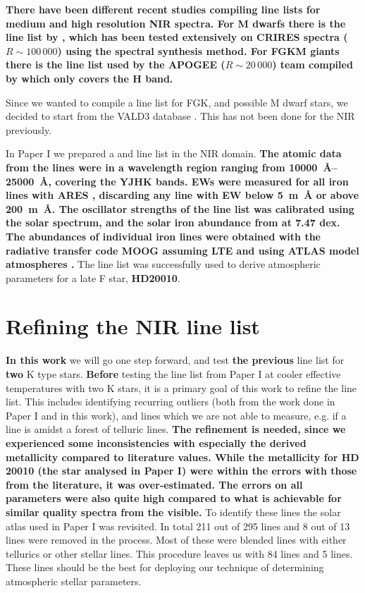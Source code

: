 \documentclass{aa}
\begin{document}
{\bf There have been different recent studies compiling line lists for medium
and high resolution NIR spectra. For M dwarfs there is the line list by
\citet{Onehag2012,Lindgren2016}, which has been tested extensively on CRIRES
spectra ($R\sim100\,000$) using the spectral synthesis method. For FGKM giants
there is the line list used by the APOGEE ($R\sim20\,000$) team compiled by
\citet{Shetrone2015} which only covers the H band.

Since we wanted to compile a line list for FGK, and possible M dwarf stars, we
decided to start from the VALD3 database \citep{VALD1,VALD2}. This has not been
done for the NIR previously.} In Paper I we prepared a  and
 line list in the NIR domain. {\bf The atomic data from the lines
were in a wavelength region ranging from \SIrange{10000}{25000}{\AA}, covering
the YJHK bands. EWs were measured for all iron lines with ARES
\citep{Sousa2015a}, discarding any line with EW below \SI{5}{m\AA} or above
\SI{200}{m\AA}. The oscillator strengths of the line list was calibrated using
the solar spectrum, and the solar iron abundance from \citet{Gonzalez2000} at
7.47 dex. The abundances of individual iron lines were obtained with the
radiative transfer code MOOG \citep{Sneden1973} assuming LTE and using ATLAS
model atmospheres \citep{Kurucz1993}.} The line list was successfully used to
derive atmospheric parameters for a late F star, {\bf HD20010}.


\section{Refining the NIR line list}
\label{sec:refining_the_line_list}

{\bf In this work} we will go one step forward, and test {\bf the previous} line
list for {\bf two} K type stars. {\bf Before} testing the line list from Paper I
at cooler effective temperatures with two K stars, it is a primary goal of this
work to refine the line list. This includes identifying recurring outliers (both
from the work done in Paper I and in this work), and lines which we are not able
to measure, e.g. if a line is amidst a forest of telluric lines. {\bf The
refinement is needed, since we experienced some inconsistencies with especially
the derived metallicity compared to literature values. While the metallicity for
HD 20010 (the star analysed in Paper I) were within the errors with those from
the literature, it was over-estimated. The errors on all parameters were also
quite high compared to what is achievable for similar quality spectra from the
visible.} To identify these lines the solar atlas used in Paper I was revisited.
In total 211 out of 295  lines and 8 out of 13  lines
were removed in the process. Most of these were blended lines with either
tellurics or other stellar lines. This procedure leaves us with 84 
lines and 5  lines. These lines should be the best for deploying our
technique of determining atmospheric stellar parameters.
\end{document}
